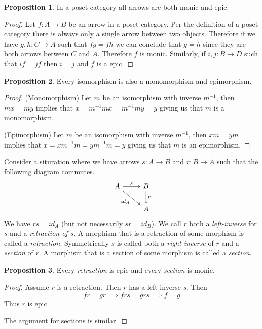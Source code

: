 \documentclass{book}
\theoremstyle{definition}
\newtheorem{proposition}{Proposition}
\newcommand{\arr}[3]{#1 : #2 \rightarrow #3}
\newcommand\id{\mathit{id}}
\begin{document}
\begin{proposition}
  In a poset category all arrows are both monic and epic.
\end{proposition}
\begin{proof}
  Let $\arr{f}{A}{B}$ be an arrow in a poset category. Per the definition of a
  poset category there is always only a single arrow between two objects.
  Therefore if we have $\arr{g, h}{C}{A}$ such that $fg = fh$ we can conclude
  that $g = h$ since they are both arrows between $C$ and $A$. Therefore $f$ is
  monic. Similarly, if $\arr{i, j}{B}{D}$ such that $if = jf$ then $i = j$ and
  $f$ is a epic.
\end{proof}

\begin{proposition}
  Every isomorphism is also a monomorphism and epimorphism.
\end{proposition}
\begin{proof}
  (Monomorphism) Let $m$ be an isomorphism with inverse $m^{-1}$, then $mx = my$
  implies that $x = m^{-1}mx = m^{-1}my = y$ giving us that $m$ is a
  monomorphism.

  (Epimorphism) Let $m$ be an isomorphism with inverse $m^{-1}$, then $xm = ym$
  implies that $x = xm^{-1}m = ym^{-1}m = y$ giving us that $m$ is an
  epimorphism.
\end{proof}

Consider a situration where we have arrows $s : A \to B$ and $r : B \to A$ such
that the following diagram commutes.
\[
  \begin{tikzcd}
  A \ar[r, "s"] \ar[dr, "\id_A"'] & B \ar[d, "r"] \\
                                  & A
  \end{tikzcd}
\]
We have $rs = \id_{A}$ (but not necessarily $sr = \id_{B}$). We call $r$ both a
\emph{left-inverse} for $s$ and a \emph{retraction of $s$}. A morphism that is a
retraction of some morphism is called a \emph{retraction}. Symmetrically $s$ is
called both a \emph{right-inverse} of $r$ and a \emph{section} of $r$. A
morphism that is a section of some morphism is called a \emph{section}.

\begin{proposition}
  Every \emph{retraction} is epic and every \emph{section} is monic.
\end{proposition}
\begin{proof}
  Assume $r$ is a retraction. Then $r$ has a left inverse $s$. Then
  \[
    fr = gr \implies frs = grs \implies f = g
  \]
  Thus $r$ is epic.

  The argument for sections is similar.
\end{proof}
\end{document}
